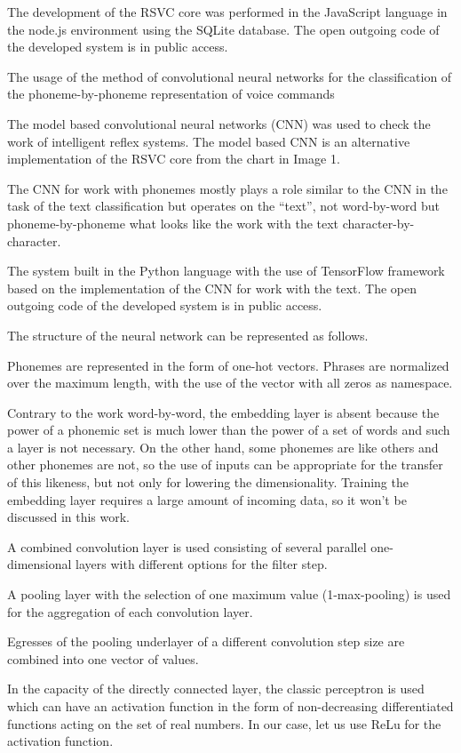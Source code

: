 The development of the RSVC core was performed in the JavaScript language in the node.js environment using the SQLite database. The open outgoing code of the developed system is in public access. 

The usage of the method of convolutional neural networks for the classification of the phoneme-by-phoneme representation of voice commands 

The model based convolutional neural networks (CNN) was used to check the work of intelligent reflex systems. The model based CNN is an alternative implementation of the RSVC core from the chart in Image 1. 

The CNN for work with phonemes mostly plays a role similar to the CNN in the task of the text classification but operates on the “text”, not word-by-word but phoneme-by-phoneme what looks like the work with the text character-by-character. 

The system built in the Python language with the use of TensorFlow framework based on the implementation of the CNN for work with the text. The open outgoing code of the developed system is in public access. 

The structure of the neural network can be represented as follows. 

Phonemes are represented in the form of one-hot vectors. Phrases are normalized over the maximum length, with the use of the vector with all zeros as namespace.

Contrary to the work word-by-word, the embedding layer is absent because the power of a phonemic set is much lower than the power of a set of words and such a layer is not necessary. On the other hand, some phonemes are like others and other phonemes are not, so the use of inputs can be appropriate for the transfer of this likeness, but not only for lowering the dimensionality. Training the embedding layer requires a large amount of incoming data, so it won’t be discussed in this work. 

A combined convolution layer is used consisting of several parallel one-dimensional layers with different options for the filter step. 

A pooling layer with the selection of one maximum value (1-max-pooling) is used for the aggregation of each convolution layer. 

Egresses of the pooling underlayer of a different convolution step size are combined into one vector of values. 

In the capacity of the directly connected layer, the classic perceptron is used which can have an activation function in the form of non-decreasing differentiated functions acting on the set of real numbers. In our case, let us use ReLu for the activation function.


